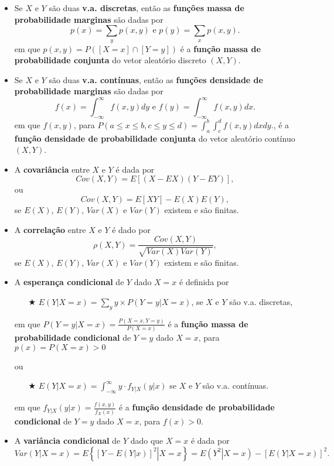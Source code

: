 \documentclass[10pt]{article}%
\begin{document}
\begin{itemize}
    \item Se $X$ e $Y$ são duas {\bf v.a. discretas}, então as {\bf funções massa de probabilidade marginas} são dadas por 
    $$p(x) = \sum_y p(x, y) \text{ e } p(y) = \sum_x p(x, y).$$
    em que $p(x, y) = P([X=x] \cap [Y=y])$ é a {\bf função massa de probabilidade conjunta} do vetor aleatório discreto $(X, Y)$.
    
    \item Se $X$ e $Y$ são duas {\bf v.a. contínuas}, então as {\bf funções densidade de probabilidade marginas} são dadas por 
    $$f(x) = \int_{-\infty}^{\infty} f(x, y) dy \text{ e } f(y) = \int_{-\infty}^{\infty} f(x, y) dx.$$
    em que $f(x, y)$, para $P( a \leq x \leq b, c \leq y \leq d) = \int_a^b \int_c^d f(x,y) dx dy.$, é a {\bf função densidade de probabilidade conjunta} do vetor aleatório contínuo $(X, Y)$.

    \item A {\bf covariância} entre $X$ e $Y$ é dada por 
    $$Cov(X,Y) = E \left[ (X - EX) (Y - EY) \right],$$ 
    ou
    $$Cov(X,Y) = E \left[ X Y \right] - E(X) E(Y),$$
    se $E(X)$, $E(Y)$, $Var(X)$ e $Var(Y)$ existem e são finitas.

    \item A {\bf correlação} entre $X$ e $Y$ é dado por 
    $$\rho(X,Y) = \frac{ Cov(X,Y)}{ \sqrt{Var(X)Var(Y)}},$$ 
    se $E(X)$, $E(Y)$, $Var(X)$ e $Var(Y)$ existem e são finitas.

    \item A {\bf esperança condicional} de $Y$ dado $X=x$ é definida por 
    \begin{itemize}
        \item[$\bigstar$] $E \left( \left. Y \right| X=x \right) = \sum_y y \times P \left( \left. Y=y \right| X=x \right)$, se $X$ e $Y$ são v.a. discretas,
    \end{itemize}
    em que $P \left( \left. Y=y \right| X=x \right) = \frac{P(X=x,Y=y)}{P \left( X=x\right)}$ é a {\bf função massa de probabilidade condicional} de $Y=y$ dado $X=x$, para $p(x) = P(X=x)>0$
    
    ou

    \begin{itemize}
        \item[$\bigstar$] $E\left( \left. Y \right| X=x \right) = \int_{-\infty}^{\infty} y \cdot f_{ \left. Y \right| X} \left( \left. y \right| x \right)$ se $X$ e $Y$ são v.a. contínuas.
    \end{itemize}
    em que $f_{ \left.Y \right| X} \left( \left. y \right| x \right) = \frac{f(x,y)}{f_X \left( x \right)}$ é a {\bf função densidade de probabilidade condicional} de $Y=y$ dado $X=x$, para $f(x) > 0$.

\item A {\bf variância condicional} de $Y$ dado que $X=x$ é dada por
$$ Var \left( \left. Y \right| X=x \right) = E \left\{ \left[ Y - E \left(  \left. Y \right| x \right) \right]^2 \left. \right| X=x  \right\} = E \left(  \left. Y^2 \right| X=x  \right) - \left[ E \left(  \left. Y \right| X=x  \right) \right]^2.$$
\end{itemize}
\end{document}
